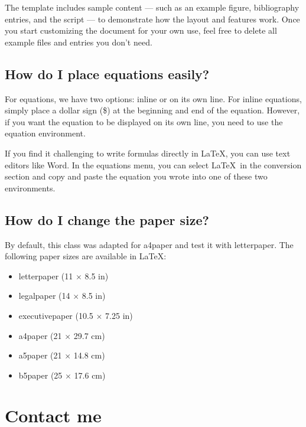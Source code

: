 \documentclass[9pt,a4paper,twocolumn,twoside]{tau-class/tau}
\begin{document}
        The template includes sample content — such as an example figure, bibliography entries, and the  script — to demonstrate how the layout and features work. Once you start customizing the document for your own use, feel free to delete all example files and entries you don’t need.

    \subsection*{How do I place equations easily?}

        For equations, we have two options: inline or on its own line. For inline equations, simply place a dollar sign (\$) at the beginning and end of the equation. However, if you want the equation to be displayed on its own line, you need to use the equation environment.
        
        If you find it challenging to write formulas directly in \LaTeX, you can use text editors like Word. In the equations menu, you can select \LaTeX\ in the conversion section and copy and paste the equation you wrote into one of these two environments.

    \subsection*{How do I change the paper size?}

        By default, this class was adapted for a4paper and test it with letterpaper. The following paper sizes are available in \LaTeX:

        \begin{itemize}
            \item letterpaper (11 $\times$ 8.5 in)
            \item legalpaper (14 $\times$ 8.5 in)
            \item executivepaper (10.5 $\times$ 7.25 in)
            \item a4paper (21 $\times$ 29.7 cm)
            \item a5paper (21 $\times$ 14.8 cm)
            \item b5paper (25 $\times$ 17.6 cm)
       \end{itemize}

\section*{Contact me}
    
\end{document}
